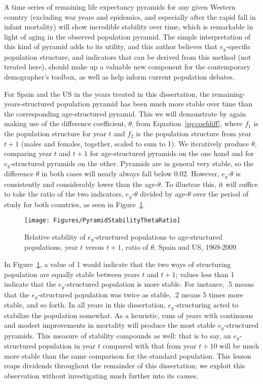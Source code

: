 A time series of remaining life expectancy pyramids for any given Western 
country (excluding war years and epidemics, and especially after the rapid fall
in infant mortality) will show incredible stability over time, which is
remarkable in light of aging in the observed population pyramid. The simple 
interpretation of this kind of pyramid adds to its utility, and this author 
believes that $e_y$-specific population structure, and
indicators that can be derived from this method (not treated here), should 
make up a valuable new component for the contemporary demographer's toolbox, as
well as help inform current population debates. 

For Spain and the US in the years treated in this dissertation,
the remaining-years-structured population pyramid has been much more
stable over time than the corresponding age-structured pyramid. This we will
demonstrate by again making use of the difference coefficient, $\theta$, from
Equation~\eqref{eq:coefdiff}, where $f_1$ is the population structure for year
$t$ and $f_2$ is the population structure from year $t+1$ (males and females, together, scaled to sum to 1). We iteratively
produce $\theta$, comparing year $t$ and $t+1$ for age-structured pyramids on
the one hand and for $e_y$-structured pyramids on the other. Pyramids are in
general very stable, so the difference $\theta$ in both cases will nearly always
fall below 0.02. However, $e_y$-$\theta$ is consistently and considerably lower
than the age-$\theta$. To illustrae this, it will suffice to take the ratio of
the two indicators, $e_y$-$\theta$ divided by age-$\theta$ over the period of study for both
 countries, as seen in Figure~\ref{fig:PyramidStability}.
\begin{figure}
      \centering
      \caption{Relative stability of $e_y$-structured populations to
                age-structured populations, year $t$ versus $t+1$, ratio of
                $\theta$, Spain and US, 1969-2009} 
         \texttt{[image: Figures/PyramidStabilityThetaRatio]}
      \label{fig:PyramidStability} 
\end{figure}

In Figure~\ref{fig:PyramidStability}, a value of 1 would indicate that the two
ways of structuring population are equally stable between years $t$ and $t+1$;
values less than 1 indicate that the $e_y$-structured population is more stable.
For instance, .5 means that the $e_y$-structured population was twice as stable,
.2 means 5 times more stable, and so forth. In all years in this dissertation,
$e_y$-structuring acted to stabilize the population somewhat. As a heuristic,
runs of years with continuous and modest improvements in mortality will produce
the most stable $e_y$-structured pyramids. This measure of stability compounds
as well: that is to say, an $e_y$-structured population in year $t$
compared with that from year $t+10$ will be much more stable than the same
comparison for the standard population. This lesson reaps dividends
throughout the remainder of this dissertation; we exploit this observation
without investigating much further into its causes.

